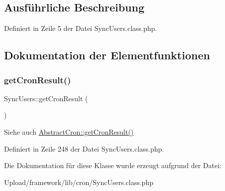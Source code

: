 \subsection{Ausführliche Beschreibung}


Definiert in Zeile 5 der Datei Sync\+Users.\+class.\+php.



\subsection{Dokumentation der Elementfunktionen}
\mbox{\label{class_sync_users_a1206029fdd16729ed8c9bea45ec96442}} 
\subsubsection{\texorpdfstring{get\+Cron\+Result()}{getCronResult()}}
{\footnotesize\ttfamily Sync\+Users\+::get\+Cron\+Result (\begin{DoxyParamCaption}{ }\end{DoxyParamCaption})}

\begin{DoxySeeAlso}{Siehe auch}
\mbox{\hyperlink{class_abstract_cron_abf70f559a58a6ceeb823b81b51fbbfe1}{Abstract\+Cron\+::get\+Cron\+Result()}} 
\end{DoxySeeAlso}


Definiert in Zeile 248 der Datei Sync\+Users.\+class.\+php.



Die Dokumentation für diese Klasse wurde erzeugt aufgrund der Datei\+:\begin{DoxyCompactItemize}
\item 
Upload/framework/lib/cron/Sync\+Users.\+class.\+php\end{DoxyCompactItemize}
